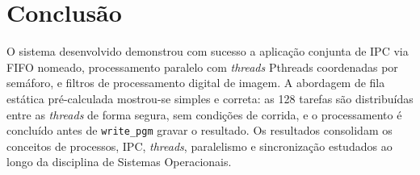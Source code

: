 \documentclass[12 pt]{abntex2}
\begin{document}
\section{Conclusão}

O sistema desenvolvido demonstrou com sucesso a aplicação conjunta de IPC
via FIFO nomeado, processamento paralelo com \textit{threads} Pthreads
coordenadas por semáforo, e filtros de processamento digital de imagem. A
abordagem de fila estática pré-calculada mostrou-se simples e correta:
as 128 tarefas são distribuídas entre as \textit{threads} de forma segura,
sem condições de corrida, e o processamento é concluído antes de
\texttt{write\_pgm} gravar o resultado. Os resultados consolidam os conceitos
de processos, IPC, \textit{threads}, paralelismo e sincronização estudados
ao longo da disciplina de Sistemas Operacionais.
\end{document}
